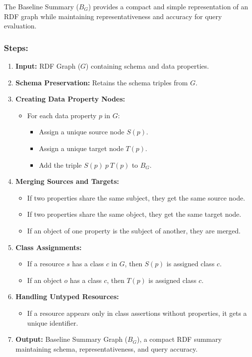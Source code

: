 \documentclass[article,submit,pdftex,moreauthors]{Definitions/mdpi}
\begin{document}
\vspace{0.5cm}

The Baseline Summary ($B_G$) provides a compact and simple representation of an RDF graph while maintaining representativeness and accuracy for query evaluation.

\subsubsection*{Steps:}

\begin{enumerate}
    \item \textbf{Input:} RDF Graph ($G$) containing schema and data properties.
    \item \textbf{Schema Preservation:} Retains the schema triples from $G$.
    \item \textbf{Creating Data Property Nodes:}
    \begin{itemize}
        \item For each data property $p$ in $G$:
        \begin{itemize}
            \item Assign a unique source node $S(p)$.
            \item Assign a unique target node $T(p)$.
            \item Add the triple $S(p) \ p \ T(p)$ to $B_G$.
        \end{itemize}
    \end{itemize}
    \item \textbf{Merging Sources and Targets:}
    \begin{itemize}
        \item If two properties share the same subject, they get the same source node.
        \item If two properties share the same object, they get the same target node.
        \item If an object of one property is the subject of another, they are merged.
    \end{itemize}
    \item \textbf{Class Assignments:}
    \begin{itemize}
        \item If a resource $s$ has a class $c$ in $G$, then $S(p)$ is assigned class $c$.
        \item If an object $o$ has a class $c$, then $T(p)$ is assigned class $c$.
    \end{itemize}
    \item \textbf{Handling Untyped Resources:}
    \begin{itemize}
        \item If a resource appears only in class assertions without properties, it gets a unique identifier.
    \end{itemize}
    \item \textbf{Output:} Baseline Summary Graph ($B_G$), a compact RDF summary maintaining schema, representativeness, and query accuracy.
\end{enumerate}
\end{document}
